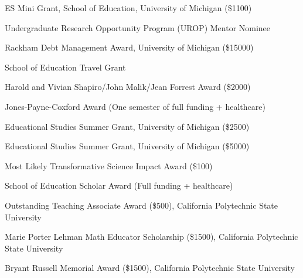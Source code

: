  ES Mini Grant, School of Education, University of Michigan (\$1100)

 Undergraduate Research Opportunity Program (UROP) Mentor Nominee

 Rackham Debt Management Award, University of Michigan (\$15000)

 School of Education Travel Grant

 Harold and Vivian Shapiro/John Malik/Jean Forrest Award (\$2000)

 Jones-Payne-Coxford Award (One semester of full funding + healthcare)

 Educational Studies Summer Grant, University of Michigan (\$2500)

 Educational Studies Summer Grant, University of Michigan (\$5000)

 Most Likely Transformative Science Impact Award (\$100)

 School of Education Scholar Award (Full funding + healthcare)

 Outstanding Teaching Associate Award (\$500), California Polytechnic State University

 Marie Porter Lehman Math Educator Scholarship (\$1500), California Polytechnic State University

 Bryant Russell Memorial Award (\$1500), California Polytechnic State University 